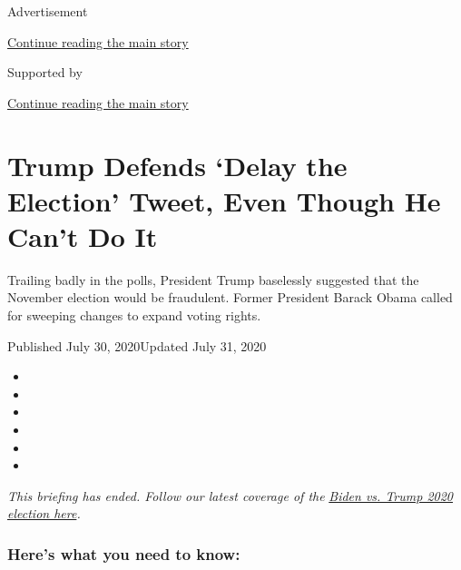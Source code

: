 Advertisement

\protect\hyperlink{after-top}{Continue reading the main story}

Supported by

\protect\hyperlink{after-sponsor}{Continue reading the main story}

\hypertarget{trump-defends-delay-the-election-tweet-even-though-he-cant-do-it}{%
\section{Trump Defends `Delay the Election' Tweet, Even Though He Can't
Do
It}\label{trump-defends-delay-the-election-tweet-even-though-he-cant-do-it}}

Trailing badly in the polls, President Trump baselessly suggested that
the November election would be fraudulent. Former President Barack Obama
called for sweeping changes to expand voting rights.

Published July 30, 2020Updated July 31, 2020

\begin{itemize}
\item
\item
\item
\item
\item
\item
\end{itemize}

\emph{This briefing has ended. Follow our latest coverage of the}
\href{https://www.nytimes3xbfgragh.onion/2020/07/31/us/elections/biden-vs-trump.html}{\emph{Biden
vs. Trump 2020 election here}}\emph{.}

\hypertarget{heres-what-you-need-to-know}{%
\subsubsection{Here's what you need to
know:}\label{heres-what-you-need-to-know}}

